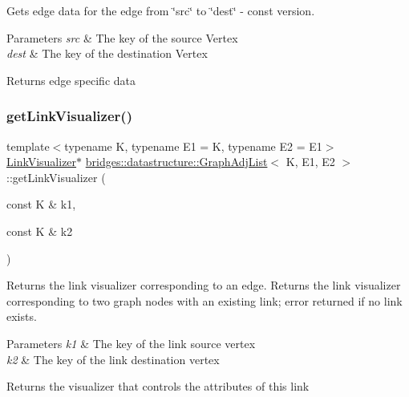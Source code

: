 Gets edge data for the edge from \char`\"{}src\char`\"{} to \char`\"{}dest\char`\"{} -\/ const version. 


\begin{DoxyParams}{Parameters}
{\em src} & The key of the source Vertex \\
\hline
{\em dest} & The key of the destination Vertex\\
\hline
\end{DoxyParams}
\begin{DoxyReturn}{Returns}
edge specific data 
\end{DoxyReturn}
\mbox{\label{classbridges_1_1datastructure_1_1_graph_adj_list_ae36ba10fae403339df0c36707ed13536}} 
\subsubsection{\texorpdfstring{get\+Link\+Visualizer()}{getLinkVisualizer()}}
{\footnotesize\ttfamily template$<$typename K, typename E1 = K, typename E2 = E1$>$ \\
\hyperlink{classbridges_1_1datastructure_1_1_link_visualizer}{Link\+Visualizer}$\ast$ \hyperlink{classbridges_1_1datastructure_1_1_graph_adj_list}{bridges\+::datastructure\+::\+Graph\+Adj\+List}$<$ K, E1, E2 $>$\+::get\+Link\+Visualizer (\begin{DoxyParamCaption}\item[{const K \&}]{k1,  }\item[{const K \&}]{k2 }\end{DoxyParamCaption})\hspace{0.3cm}{\ttfamily [inline]}}



Returns the link visualizer corresponding to an edge. Returns the link visualizer corresponding to two graph nodes with an existing link; error returned if no link exists. 


\begin{DoxyParams}{Parameters}
{\em k1} & The key of the link source vertex \\
\hline
{\em k2} & The key of the link destination vertex\\
\hline
\end{DoxyParams}
\begin{DoxyReturn}{Returns}
the visualizer that controls the attributes of this link 
\end{DoxyReturn}
\mbox{\label{classbridges_1_1datastructure_1_1_graph_adj_list_ada58af550495cee2fe454c0be0f8504e}} 
